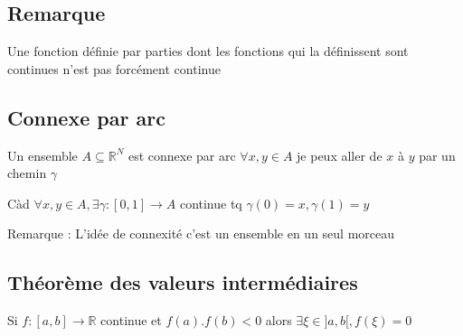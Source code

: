 \documentclass[a4paper,10pt]{article}
\newcommand{\ap}{\rightarrow}
\newcommand{\R}{\mathbb{R}}
\newcommand{\tset}[1]{\left\lbrace #1 \right\rbrace}
\begin{document}
\subsection{Remarque}

Une fonction définie par parties dont les fonctions qui la définissent sont continues n'est pas forcément continue








\subsection{Connexe par arc}

Un ensemble $A \subseteq \R^N$ est connexe par arc $\forall x,y \in A$ je peux aller de $x$ à $y$ par un chemin $\gamma$

Càd $\forall x,y \in A, \exists \gamma : [0,1] \ap A$ continue tq $\gamma(0) = x, \gamma(1) = y$

Remarque : L'idée de connexité c'est un ensemble en un seul morceau


\subsection{Théorème des valeurs intermédiaires}

Si $f : [a,b] \ap \R$ continue et $f(a).f(b) < 0$ alors $\exists \xi \in ]a,b[, f(\xi) = 0$
\end{document}
